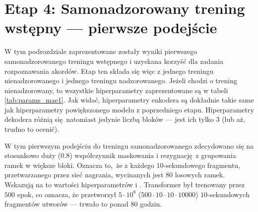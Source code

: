 \section{Etap 4: Samonadzorowany trening wstępny --- pierwsze podejście}

W tym podrozdziale zaprezentowane zostały wyniki pierwszego samonadzorowanego treningu wstępnego i uzyskana korzyść dla zadania rozpoznawania akordów. Etap ten składa się więc z jednego treningu nienadzorowanego i jednego treningu nadzorowanego. Jeżeli chodzi o trening nienadzorowany, to wszystkie hiperparametry zaprezentowane są w tabeli \ref{tab:params_mae1}. Jak widać, hiperparametry enkodera są dokładnie takie same jak hiperparametry powiększonego modelu z poprzedniego etapu. Hiperparametry dekodera różnią się natomiast jedynie liczbą bloków --- jest ich tylko $3$ (lub aż, trudno to ocenić). 

W tym pierwszym podejściu do treningu samonadzorowanego zdecydowano się na stosunkowo duży ($0.8$) współczynnik maskowania i rezygnację z grupowania ramek w większe bloki. Oznacza to, że z każdego $10$-sekundowego fragmentu, przetwarzanego przez sieć nagrania, wycinanych jest $80$ losowych ramek. Wskazują na to wartości hiperparametrów   i . Transformer był trenowany przez $500$ epok, co oznacza, że przetworzył $5 \cdot 10^8$ ($500 \cdot 10 \cdot 10 \cdot 10000$) $10$-sekundowych fragmentów utworów --- trwało to ponad $80$ godzin.

